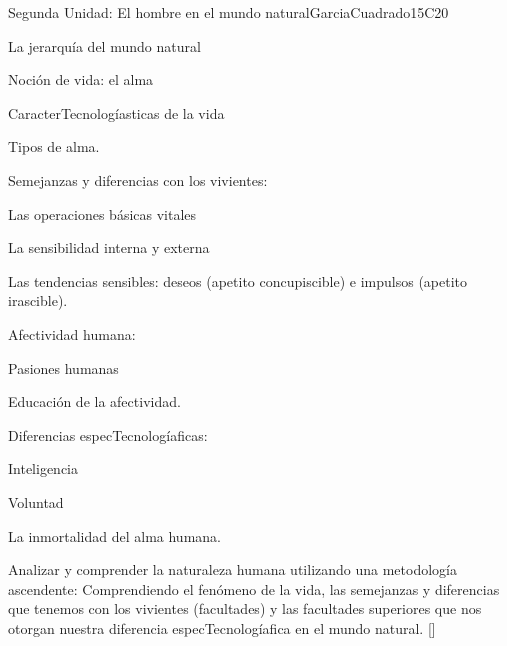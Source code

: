 \begin{syllabus}
\begin{unit}{}{Segunda Unidad: El hombre en el mundo natural}{GarciaCuadrado}{15}{C20}
\begin{topics}
	\item La jerarquía del mundo natural 
		\begin{subtopics} 
			\item Noción de vida: el alma
			\item CaracterTecnologíasticas de la vida
			\item Tipos de alma. 
		\end{subtopics}
	\item Semejanzas y diferencias con los vivientes: 
		\begin{subtopics} 
			\item Las operaciones básicas vitales
			\item La sensibilidad interna y externa
			\item Las tendencias sensibles: deseos (apetito concupiscible) e impulsos (apetito irascible).
		\end{subtopics}
	\item Afectividad humana:
		\begin{subtopics}
			 \item Pasiones humanas
			\item Educación de la afectividad.
		\end{subtopics}
	\item Diferencias especTecnologíaficas: 
		\begin{subtopics} 
			\item Inteligencia
			\item Voluntad
			\item La inmortalidad del alma humana.
		\end{subtopics}
\end{topics}
\begin{learningoutcomes}
	\item Analizar y comprender la naturaleza humana utilizando una metodología ascendente: Comprendiendo el fenómeno de la vida, las semejanzas y diferencias que tenemos con los vivientes (facultades) y las facultades superiores que nos otorgan nuestra diferencia especTecnologíafica en el mundo natural. [\Usage]
\end{learningoutcomes}
\end{unit}


\end{syllabus}
